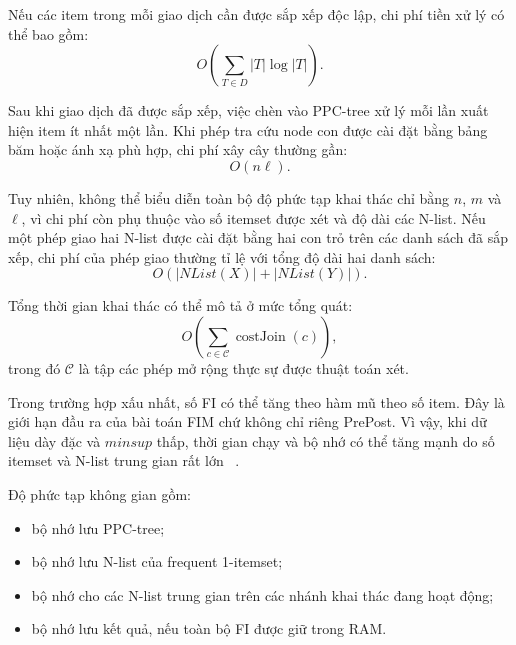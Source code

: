 Nếu các item trong mỗi giao dịch cần được sắp xếp độc lập, chi phí tiền xử lý
có thể bao gồm:
\begin{equation}
    O\!\left(
        \sum_{T \in D}|T|\log |T|
    \right).
    \label{eq:transaction-sort-complexity}
\end{equation}

Sau khi giao dịch đã được sắp xếp, việc chèn vào PPC-tree xử lý mỗi lần xuất
hiện item ít nhất một lần. Khi phép tra cứu node con được cài đặt bằng bảng băm
hoặc ánh xạ phù hợp, chi phí xây cây thường gần:
\begin{equation}
    O(n\ell).
    \label{eq:tree-building-complexity}
\end{equation}

Tuy nhiên, không thể biểu diễn toàn bộ độ phức tạp khai thác chỉ bằng $n$, $m$
và $\ell$, vì chi phí còn phụ thuộc vào số itemset được xét và độ dài các
N-list. Nếu một phép giao hai N-list được cài đặt bằng hai con trỏ trên các
danh sách đã sắp xếp, chi phí của phép giao thường tỉ lệ với tổng độ dài hai
danh sách:
\begin{equation}
    O\!\left(
        |NList(X)|+|NList(Y)|
    \right).
    \label{eq:nlist-intersection-complexity}
\end{equation}

Tổng thời gian khai thác có thể mô tả ở mức tổng quát:
\begin{equation}
    O\!\left(
        \sum_{c \in \mathcal{C}}
        \operatorname{costJoin}(c)
    \right),
    \label{eq:mining-total-complexity}
\end{equation}
trong đó $\mathcal{C}$ là tập các phép mở rộng thực sự được thuật toán xét.

Trong trường hợp xấu nhất, số FI có thể tăng theo hàm mũ theo số item. Đây là
giới hạn đầu ra của bài toán FIM chứ không chỉ riêng PrePost. Vì vậy, khi dữ
liệu dày đặc và $\mathit{minsup}$ thấp, thời gian chạy và bộ nhớ có thể tăng
mạnh do số itemset và N-list trung gian rất lớn
~\cite{han2011datamining,luna2019review}.

Độ phức tạp không gian gồm:
\begin{itemize}
    \item bộ nhớ lưu PPC-tree;
    \item bộ nhớ lưu N-list của frequent 1-itemset;
    \item bộ nhớ cho các N-list trung gian trên các nhánh khai thác đang hoạt động;
    \item bộ nhớ lưu kết quả, nếu toàn bộ FI được giữ trong RAM.
\end{itemize}

